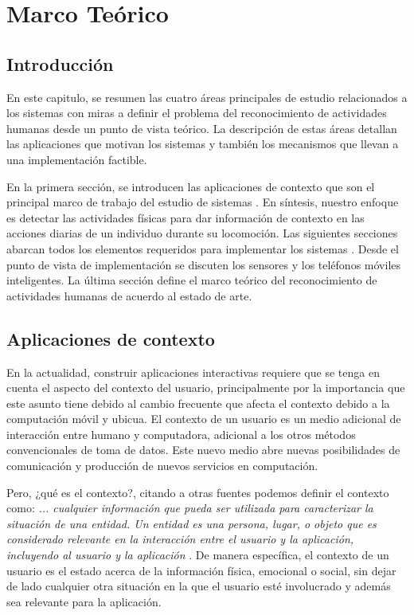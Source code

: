 
\chapter{Marco Teórico}

\label{chap2:marco-teorico}

\section{Introducción}

\label{sec21:introduccion}En este capitulo, se resumen las cuatro
áreas principales de estudio relacionados a los sistemas 
con miras a definir el problema del reconocimiento de actividades
humanas desde un punto de vista teórico. La descripción de estas áreas
detallan las aplicaciones que motivan los sistemas  y también
los mecanismos que llevan a una implementación factible. 

En la primera sección, se introducen las aplicaciones de contexto
que son el principal marco de trabajo del estudio de sistemas .
En síntesis, nuestro enfoque es detectar las actividades físicas para
dar información de contexto en las acciones diarias de un individuo
durante su locomoción. Las siguientes secciones abarcan todos los
elementos requeridos para implementar los sistemas . Desde
el punto de vista de implementación se discuten los sensores y los
teléfonos móviles inteligentes. La última sección define el marco
teórico del reconocimiento de actividades humanas de acuerdo al estado
de arte.

\section{Aplicaciones de contexto}

\label{sec22:contexto}En la actualidad, construir aplicaciones interactivas
requiere que se tenga en cuenta el aspecto del contexto del usuario,
principalmente por la importancia que este asunto tiene debido al
cambio frecuente que afecta el contexto debido a la computación móvil
y ubicua. El contexto de un usuario es un medio adicional de interacción
entre humano y computadora, adicional a los otros métodos convencionales
de toma de datos. Este nuevo medio abre nuevas posibilidades de
comunicación y producción de nuevos servicios en computación. 

Pero, ¿qué es el contexto?, citando a otras fuentes podemos definir
el contexto como: \textquotedbl{}\emph{... cualquier información que
pueda ser utilizada para caracterizar la situación de una entidad.
Un entidad es una persona, lugar, o objeto que es considerado relevante
en la interacción entre el usuario y la aplicación, incluyendo al
usuario y la aplicación}\textquotedbl{} \cite{Dey2000}. De manera
específica, el contexto de un usuario es el estado acerca de la información
física, emocional o social, sin dejar de lado cualquier otra situación
en la que el usuario esté involucrado y además sea relevante para
la aplicación.

